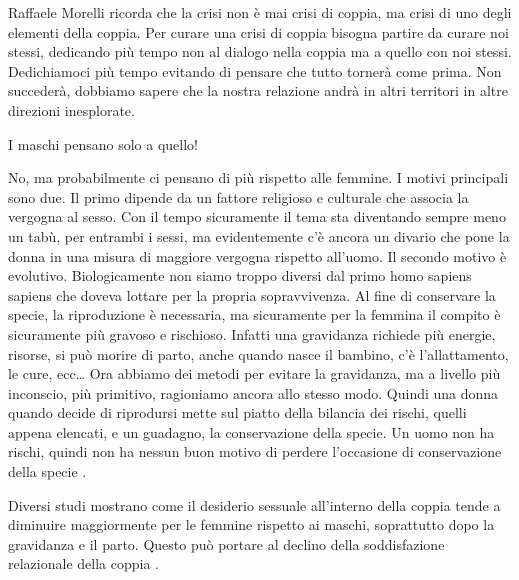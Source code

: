 \documentclass[12pt]{book} %
\begin{document}
Raffaele Morelli ricorda che la crisi non è mai crisi di coppia, ma crisi di uno degli elementi della coppia. Per curare
una crisi di coppia bisogna partire da curare noi stessi, dedicando più tempo non al dialogo nella coppia ma a quello
con noi stessi. Dedichiamoci più tempo evitando di pensare che tutto tornerà come prima. Non succederà, dobbiamo sapere
che la nostra relazione andrà in altri territori in altre direzioni inesplorate.


\bigskip
\begin{mdframed}[linewidth=1pt]
I maschi pensano solo a quello!

No, ma probabilmente ci pensano di più rispetto alle femmine. I motivi principali sono due. Il primo dipende da un
fattore religioso e culturale che associa la vergogna al sesso. Con il tempo sicuramente il tema sta diventando sempre
meno un tabù, per entrambi i sessi, ma evidentemente c'è ancora un divario che pone la donna in
una misura di maggiore vergogna rispetto all'uomo. Il secondo motivo è evolutivo. Biologicamente
non siamo troppo diversi dal primo homo sapiens sapiens che doveva lottare per la propria sopravvivenza. Al fine di
conservare la specie, la riproduzione è necessaria, ma sicuramente per la femmina il compito è sicuramente più gravoso
e rischioso. Infatti una gravidanza richiede più energie, risorse, si può morire di parto, anche quando nasce il
bambino, c'è l'allattamento, le cure, ecc… Ora abbiamo dei metodi per evitare
la gravidanza, ma a livello più inconscio, più primitivo, ragioniamo ancora allo stesso modo. Quindi una donna quando
decide di riprodursi mette sul piatto della bilancia dei rischi, quelli appena elencati, e un guadagno, la
conservazione della specie. Un uomo non ha rischi, quindi non ha nessun buon motivo di perdere
l'occasione di conservazione della specie
.

Diversi studi mostrano come il desiderio sessuale all'interno della coppia tende a diminuire
maggiormente per le femmine rispetto ai maschi, soprattutto dopo la gravidanza e il parto. Questo può portare al
declino della soddisfazione relazionale della coppia
.
\end{mdframed}
\end{document}
